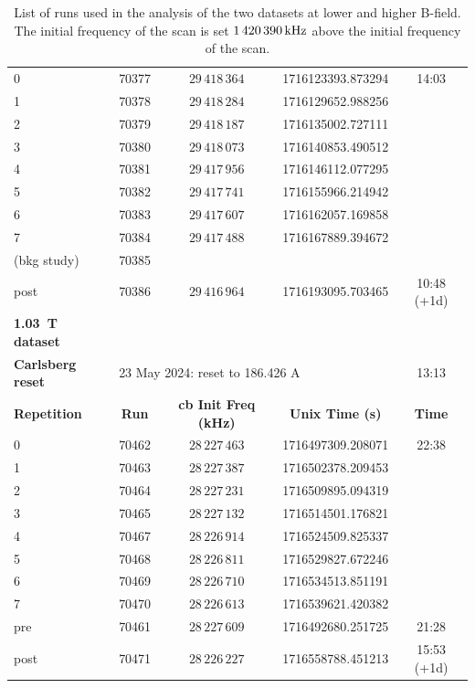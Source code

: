 \begin{table}[!ht]
\begin{tabular}{l|cccc}
         
         0              &   70377   &$29\,418\,364$	 & 1716123393.873294	& 14:03 \\ 
         1              &   70378   &$29\,418\,284$	 & 1716129652.988256	&  \\ 
         2              &   70379   &$29\,418\,187$	 & 1716135002.727111	&  \\
         3              &   70380   &$29\,418\,073$	 & 1716140853.490512	&  \\ 
         4              &   70381   &$29\,417\,956$	 & 1716146112.077295	&  \\ 
         5              &   70382   &$29\,417\,741$	 & 1716155966.214942    &  \\ 
         6              &   70383   &$29\,417\,607$	 & 1716162057.169858    &  \\
         7              &   70384   &$29\,417\,488$  &  1716167889.394672	&  \\
         \hline
         (bkg study)    &   70385   &                &  	                &  \\
         post           &   70386   & $29\,416\,964$ & 1716193095.703465    & 10:48 (+1d) \\
         \hline
         \hline
         {\bf \SI{1.03}{\tesla} dataset} & & & & \\
         {\bf Carlsberg reset} & \multicolumn{3}{l}{23 May 2024: reset to 186.426 A} & 13:13 \\
         {\bf Repetition}      & {\bf Run}  & {\bf cb Init Freq (kHz)} & {\bf Unix Time (s)} & {\bf Time} \\
          \hline 
         0            & 70462   & $28\,227\,463$	&	1716497309.208071	& 22:38 \\ 
         1            & 70463   & $28\,227\,387$	&	1716502378.209453	& \\ 
         2            & 70464   & $28\,227\,231$	&	1716509895.094319	& \\
         3            & 70465   & $28\,227\,132$    &	1716514501.176821	& \\ 
         4            & 70467   & $28\,226\,914$	&	1716524509.825337	& \\   
         5            & 70468   & $28\,226\,811$	&	1716529827.672246	& \\
         6            & 70469   & $28\,226\,710$	&	1716534513.851191	& \\
         7            & 70470   & $28\,226\,613$	&	1716539621.420382	& \\
         \hline
         pre          & 70461   & $28\,227\,609$	&	1716492680.251725	& 21:28       \\
         post         & 70471   & $28\,226\,227$    &	1716558788.451213	& 15:53 (+1d) \\
       \hline
       \hline
    \end{tabular}
    \caption{List of runs used in the analysis of the two datasets at lower and higher B-field. The initial frequency of the \da scan is set $1\,420\,390\,{\rm kHz}$ above the initial frequency of the \cb scan.}
    \label{tab:ListOfRuns}
\end{table}

